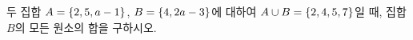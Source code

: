 두 집합 $A=\{2{,}\mkern3mu\mathopen{}5{,}\mkern3mu\mathopen{}a-1\}$, $B=\{4{,}\mkern3mu\mathopen{}2a-3\}$에 대하여 $A\cup B=\{2{,}\mkern3mu\mathopen{}4{,}\mkern3mu\mathopen{}5{,}\mkern3mu\mathopen{}7\}$일 때, 집합 $B$의 모든 원소의 합을 구하시오. 
